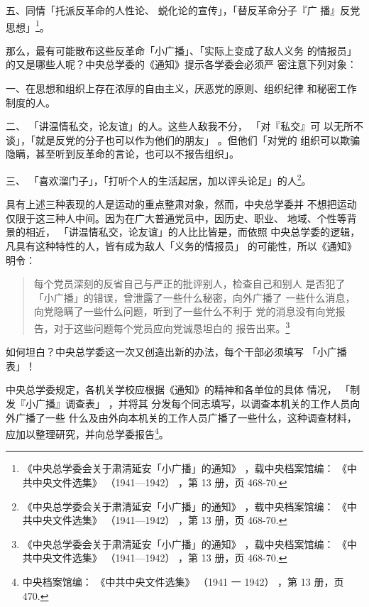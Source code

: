 五、同情「托派反革命的人性论、
蜕化论的宣传」，「替反革命分子『广
播』反党思想」\footnote{《中央总学委会关于肃清延安「小广播」的通知》
，载中央档案馆编：
《中共中央文件选集》
（1941—1942）
，第
13 册，页 468-70.}。

那么，最有可能散布这些反革命「小广播」、「实际上变成了敌人义务
的情报员」的又是哪些人呢？中央总学委的《通知》提示各学委会必须严
密注意下列对象：

一、在思想和组织上存在浓厚的自由主义，厌恶党的原则、组织纪律
和秘密工作制度的人。

二、
「讲温情私交，论友谊」的人。这些人敌我不分，
「对『私交』可
以无所不谈」，「就是反党的分子也可以作为他们的朋友」
。但他们「对党的
组织可以欺骗隐瞒，甚至听到反革命的言论，也可以不报告组织」。

三、
「喜欢溜门子」，「打听个人的生活起居，加以评头论足」的人\footnote{《中央总学委会关于肃清延安「小广播」的通知》
，载中央档案馆编：
《中共中央文件选集》
（1941—1942）
，第
13 册，页 468-70.}。

具有上述三种表现的人是运动的重点整肃对象，然而，中央总学委并
不想把运动仅限于这三种人中间。因为在广大普通党员中，因历史、职业、
地域、个性等背景的相近，
「讲温情私交，论友谊」的人比比皆是，而依照
中央总学委的逻辑，凡具有这种特性的人，皆有成为敌人「义务的情报员」
的可能性，所以《通知》明令：
\begin{quote}
{\fzwkai 每个党员深刻的反省自己与严正的批评别人，检查自己和别人
是否犯了「小广播」的错误，曾泄露了一些什么秘密，向外广播了
一些什么消息，向党隐瞒了一些什么问题，听到了一些什么不利于
党的消息没有向党报告，对于这些问题每个党员应向党诚恳坦白的
报告出来。\footnote{《中央总学委会关于肃清延安「小广播」的通知》
，载中央档案馆编：
《中共中央文件选集》
（1941—1942）
，第
13 册，页 468-70.}} 
\end{quote}

如何坦白？中央总学委这一次又创造出新的办法，每个干部必须填写
「小广播表」！

中央总学委规定，各机关学校应根据《通知》的精神和各单位的具体
情况，
「制发『小广播』调查表」
，并将其
分发每个同志填写，以调查本机关的工作人员向外广播了一些
什么及由外向本机关的工作人员广播了一些什么，这种调查材料，
应加以整理研究，并向总学委报告\footnote{中央档案馆编：
《中共中央文件选集》
（1941 一 1942）
，第 13 册，页 470.}。

